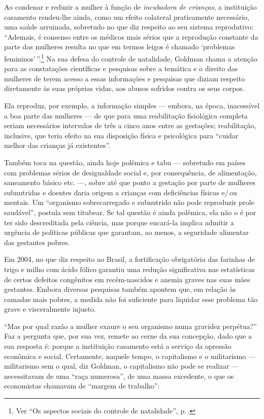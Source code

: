 Ao condenar e reduzir a mulher à função de \textit{incubadora de crianças}, a
instituição casamento rendeu-lhe ainda, como um efeito colateral
praticamente necessário, uma saúde arruinada, sobretudo no que diz
respeito ao seu sistema reprodutivo: ``Ademais, é consenso entre os médicos mais sérios que a reprodução constante da parte das mulheres resulta no que em termos leigos é
chamado `problemas femininos'\,''.\footnote{Ver ``Os aspectos sociais do controle de natalidade'', p.\,\pageref{saude}.} Na
sua defesa do controle de natalidade, Goldman chama a atenção
para as constatações científicas e pesquisas sobre a temática e o
direito das mulheres de terem acesso a essas informações e pesquisas que
diziam respeito diretamente às suas próprias vidas, aos abusos sofridos
contra os seus corpos.

Ela reproduz, por exemplo, a informação simples
--- embora, na época, inacessível a boa parte das mulheres --- de que
para uma reabilitação fisiológica completa seriam necessários intervalos
de três a cinco anos entre as gestações; reabilitação, inclusive, que
teria efeito na sua disposição física e psicológica para ``cuidar melhor
das crianças já existentes''.

Também toca na questão, ainda hoje polêmica e tabu --- sobretudo em países com problemas sérios de desigualdade
social e, por consequência, de alimentação, saneamento básico etc. ---,
sobre até que ponto a gestação por parte de mulheres subnutridas e
doentes daria origem a crianças com deficiências físicas e/\,ou mentais.
Um ``organismo sobrecarregado e subnutrido não pode reproduzir prole
saudável'', postula sem titubear. Se tal questão é ainda polêmica, ela
não o é por ter sido descreditada pela ciência, mas porque encará-la
implica admitir a urgência de políticas públicas que garantam, ao menos,
a seguridade alimentar das gestantes pobres.

Em 2004, no que diz respeito ao
Brasil, a fortificação obrigatória
das farinhas de trigo e milho com ácido fólico garantiu uma redução
significativa nas estatísticas de certos defeitos congênitos em
recém-nascidos e anemia graves nas suas mães gestantes. Embora
diversas pesquisas também apontem que, em relação às camadas
mais pobres, a medida não foi suficiente para liquidar esse problema tão
grave e visceralmente injusto.

``Mas por qual razão a mulher exaure o seu organismo numa gravidez
perpétua?'' Faz a pergunta que, por sua vez, remete ao cerne da sua
concepção, dado que a sua resposta é: porque a instituição casamento
está a serviço da opressão econômica e social. Certamente, naquele
tempo, o capitalismo e o militarismo --- militarismo sem o qual, diz
Goldman, o capitalismo não pode se realizar --- necessitavam de uma
``raça numerosa'', de uma massa excedente, o que os economistas chamavam
de ``margem de trabalho'':

